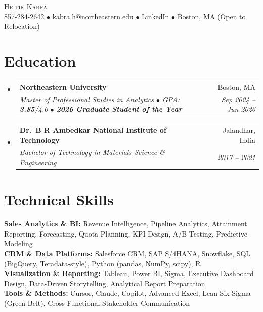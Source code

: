 \documentclass[letterpaper,10pt]{article}
\makeatletter
\newcommand{\resumeSubheading}[4]{
  \vspace{1pt}\item
    \begin{tabular*}{0.97\textwidth}[t]{l@{\extracolsep{\fill}}r}
      \textbf{#1} & #2 \\
      \textit{\small#3} & \textit{\small #4} \\
    \end{tabular*}\vspace{-4pt}
}
\newcommand{\resumeSubHeadingListStart}{\begin{itemize}[leftmargin=0.15in, label={}]}
\newcommand{\resumeSubHeadingListEnd}{\end{itemize}}
\makeatother
\begin{document}
\begin{center}
    {\Huge \scshape \color{heading} Hritik Kabra} \\ \vspace{2pt}
    \small 857-284-2642 $\bullet$
    \href{mailto:kabra.h@northeastern.edu}{\underline{kabra.h@northeastern.edu}} $\bullet$
    \href{https://www.linkedin.com/in/hritikkabra888}{\underline{LinkedIn}} $\bullet$
    Boston, MA (Open to Relocation)
\end{center}

\section{Education}
\resumeSubHeadingListStart
\resumeSubheading
{Northeastern University}{Boston, MA}
{Master of Professional Studies in Analytics $\bullet$ GPA: \textbf{3.85}/4.0 $\bullet$ \textbf{2026 Graduate Student of the Year}}{Sep 2024 -- Jun 2026}
\resumeSubheading
{Dr.\ B R Ambedkar National Institute of Technology}{Jalandhar, India}
{Bachelor of Technology in Materials Science \& Engineering}{2017 -- 2021}
\resumeSubHeadingListEnd

\section{Technical Skills}
\begin{itemize}[leftmargin=0.15in, label={}]
\small{\item{
\textbf{Sales Analytics \& BI:} Revenue Intelligence, Pipeline Analytics, Attainment Reporting, Forecasting, Quota Planning, KPI Design, A/B Testing, Predictive Modeling \\
\textbf{CRM \& Data Platforms:} Salesforce CRM, SAP S/4HANA, Snowflake, SQL (BigQuery, Teradata-style), Python (pandas, NumPy, scipy), R \\
\textbf{Visualization \& Reporting:} Tableau, Power BI, Sigma, Executive Dashboard Design, Data-Driven Storytelling, Analytical Report Preparation \\
\textbf{Tools \& Methods:} Cursor, Claude, Copilot, Advanced Excel, Lean Six Sigma (Green Belt), Cross-Functional Stakeholder Communication
}}
\end{itemize}
\end{document}

